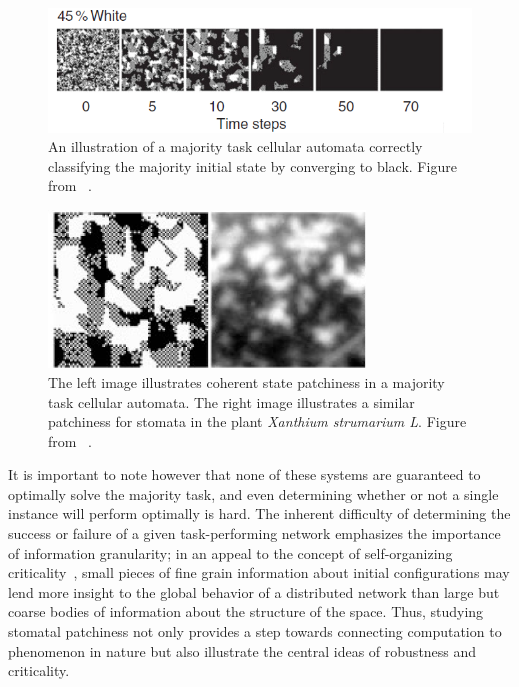 \documentclass[a4paper,11pt]{report}
\begin{document}
\begin{figure}[htp]
	\centering
	\includegraphics[width=1.0\textwidth]{mo07_fig3_maj_task.png}
	\caption[Majority Task CA]{
	An illustration of a majority task cellular automata correctly classifying the majority initial state by converging to black. Figure from \citeauthor{mo07}~\cite{mo07}.
	}
	\label{fig:maj_task}
\end{figure}

\begin{figure}[htp]
	\centering
	\includegraphics[width=0.75\textwidth]{me07_fig3_ca_stoma_comparison.png}
	\caption[Qualitative CA-Stomata Comparison]{
	The left image illustrates coherent state patchiness in a majority task cellular automata. The right image illustrates a similar patchiness for stomata in the plant \textit{Xanthium strumarium L}. Figure from \citeauthor{me07}~\cite{me07}.
	}
	\label{fig:ca_stoma}
\end{figure}

It is important to note however that none of these systems are guaranteed to optimally solve the majority task, and even determining whether or not a single instance will perform optimally is hard. The inherent difficulty of determining the success or failure of a given task-performing network emphasizes the importance of information granularity; in an appeal to the concept of self-organizing criticality~\cite{ba88}, small pieces of fine grain information about initial configurations may lend more insight to the global behavior of a distributed network than large but coarse bodies of information about the structure of the space. Thus, studying stomatal patchiness not only provides a step towards connecting computation to phenomenon in nature but also illustrate the central ideas of robustness and criticality.
\end{document}
